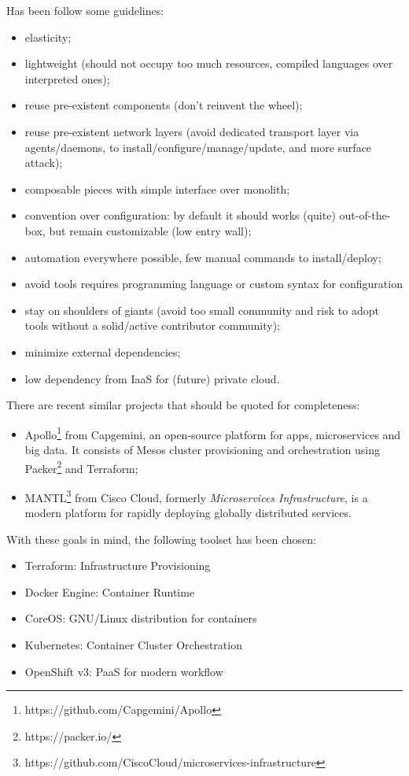 Has been follow some guidelines:

\begin{itemize}
\item elasticity;
\item lightweight (should not occupy too much resources, compiled languages
  over interpreted ones);
\item reuse pre-existent components (don't reinvent the wheel);
\item reuse pre-existent network layers (avoid dedicated transport layer via agents/daemons, to install/configure/manage/update, and more surface attack);
\item composable pieces with simple interface over monolith;
\item convention over configuration: by default it should works (quite)  out-of-the-box, but remain customizable (low entry wall);
\item automation everywhere possible, few manual commands to install/deploy;
\item avoid tools requires programming language or custom syntax for configuration
\item stay on shoulders of giants (avoid too small community and risk to adopt tools without a solid/active contributor community);
\item minimize external dependencies;
\item low dependency from IaaS for (future) private cloud.
\end{itemize}

There are recent similar projects that should be quoted for completeness:

\begin{itemize}
\item Apollo\footnote{https://github.com/Capgemini/Apollo} from Capgemini, an open-source platform for   apps, microservices and big data. It consists of Mesos cluster   provisioning and orchestration using Packer\footnote{https://packer.io/} and Terraform;
\item MANTL\footnote{https://github.com/CiscoCloud/microservices-infrastructure} from Cisco Cloud, formerly \textit{Microservices Infrastructure}, is a modern platform for rapidly   deploying globally distributed services.
\end{itemize}

With these goals in mind, the following toolset has been chosen:

\begin{itemize}
\item Terraform: Infrastructure Provisioning
\item Docker Engine: Container Runtime
\item CoreOS: GNU/Linux distribution for containers
\item Kubernetes: Container Cluster Orchestration
\item OpenShift v3: PaaS for modern workflow
\end{itemize}

